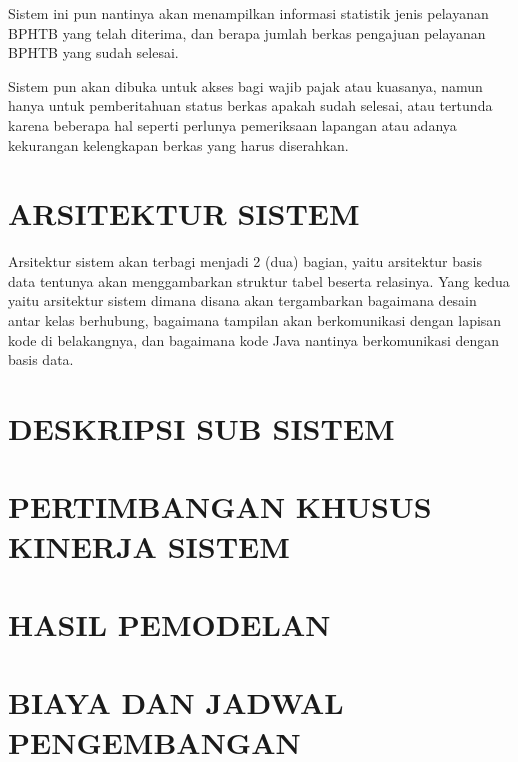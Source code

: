 \documentclass[pdftex,12pt, oneside]{article}
\begin{document}
Sistem ini pun nantinya akan menampilkan informasi statistik jenis pelayanan BPHTB yang telah diterima, dan berapa jumlah berkas pengajuan pelayanan BPHTB yang sudah selesai.

Sistem pun akan dibuka untuk akses bagi wajib pajak atau kuasanya, namun hanya untuk pemberitahuan status berkas apakah sudah selesai, atau tertunda karena beberapa hal seperti perlunya pemeriksaan lapangan atau adanya kekurangan kelengkapan berkas yang harus diserahkan.


\section{ARSITEKTUR SISTEM}

Arsitektur sistem akan terbagi menjadi 2 (dua) bagian, yaitu arsitektur basis data tentunya akan menggambarkan struktur tabel beserta relasinya. Yang kedua yaitu arsitektur sistem dimana disana akan tergambarkan bagaimana desain antar kelas berhubung, bagaimana tampilan akan berkomunikasi dengan lapisan kode di belakangnya, dan bagaimana kode Java nantinya berkomunikasi dengan basis data.



\section{DESKRIPSI SUB SISTEM}


\section{PERTIMBANGAN KHUSUS KINERJA SISTEM}


\section{HASIL PEMODELAN}


\section{BIAYA DAN JADWAL PENGEMBANGAN}
\end{document}
